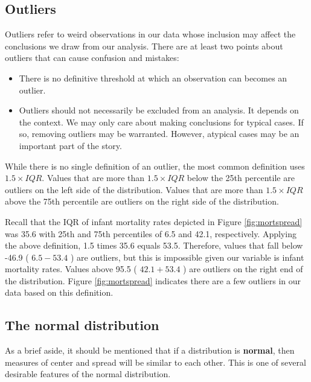 \documentclass[
]{book}
\providecommand{\tightlist}{%
  \setlength{\itemsep}{0pt}\setlength{\parskip}{0pt}}
\begin{document}
\hypertarget{outliers}{%
\subsection{Outliers}\label{outliers}}

Outliers refer to weird observations in our data whose inclusion may affect the conclusions we draw from our analysis. There are at least two points about outliers that can cause confusion and mistakes:

\begin{itemize}
\tightlist
\item
  There is no definitive threshold at which an observation can becomes an outlier.
\item
  Outliers should not necessarily be excluded from an analysis. It depends on the context. We may only care about making conclusions for typical cases. If so, removing outliers may be warranted. However, atypical cases may be an important part of the story.
\end{itemize}

While there is no single definition of an outlier, the most common definition uses \(1.5 \times IQR\). Values that are more than \(1.5 \times IQR\) below the 25th percentile are outliers on the left side of the distribution. Values that are more than \(1.5 \times IQR\) above the 75th percentile are outliers on the right side of the distribution.

Recall that the IQR of infant mortality rates depicted in Figure \ref{fig:mortspread} was 35.6 with 25th and 75th percentiles of 6.5 and 42.1, respectively. Applying the above definition, 1.5 times 35.6 equals 53.5. Therefore, values that fall below -46.9 ( \(6.5 - 53.4\) ) are outliers, but this is impossible given our variable is infant mortality rates. Values above 95.5 ( \(42.1 + 53.4\) ) are outliers on the right end of the distribution. Figure \ref{fig:mortspread} indicates there are a few outliers in our data based on this definition.

\hypertarget{the-normal-distribution}{%
\subsection{The normal distribution}\label{the-normal-distribution}}

As a brief aside, it should be mentioned that if a distribution is \textbf{normal}, then measures of center and spread will be similar to each other. This is one of several desirable features of the normal distribution.
\end{document}
